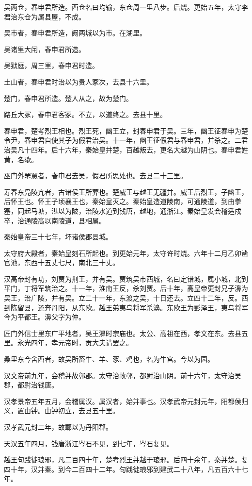 \documentclass[12pt,UTF8]{ctexbook}
\begin{document}
吴两仓，春申君所造。西仓名曰均输，东仓周一里八步。后烧。更始五年，太守李君治东仓为属县屋，不成。

吴市者，春申君所造，阙两城以为市。在湖里。

吴诸里大闬，春申君所造。

吴狱庭，周三里，春申君时造。

土山者，春申君时治以为贵人冢次，去县十六里。

楚门，春申君所造。楚人从之，故为楚门。

路丘大冢，春申君客冢。不立，以道终之。去县十里。

春申君，楚考烈王相也。烈王死，幽王立，封春申君于吴。三年，幽王征春申为楚令尹，春申君自使其子为假君治吴。十一年，幽王征假君与春申君，并杀之。二君治吴凡十四年。后十六年，秦始皇并楚，百越叛去，更名大越为山阴也。春申君姓黄，名歇。

巫门外罘罳者，春申君去吴，假君所思处也。去县二十三里。

寿春东凫陵亢者，古诸侯王所葬也。楚威王与越王无疆并。威王后烈王，子幽王，后怀王也。怀王子顷襄王也，秦始皇灭之。秦始皇造道陵南，可通陵道，到由拳塞，同起马塘，湛以为陂，治陵水道到钱唐，越地，通浙江。秦始皇发会稽适戍卒，治通陵高以南陵道，县相属。

秦始皇帝三十七年，坏诸侯郡县城。

太守府大殿者，秦始皇刻石所起也。到更始元年，太守许时烧。六年十二月乙卯凿官池，东西十五丈七尺，南北三十丈。

汉高帝封有功，刘贾为荆王，并有吴。贾筑吴市西城，名曰定错城，属小城，北到平门，丁将军筑治之。十一年，淮南王反，杀刘贾。后十年，高皇帝更封兄子濞为吴王，治广陵，并有吴。立二十一年，东渡之吴，十日还去。立四十二年，反。西到陈留县，还奔丹阳，从东欧。越王弟夷乌将军杀濞。东欧王为彭泽王，夷乌将军今为平都王。濞父字为仲。

匠门外信士里东广平地者，吴王濞时宗庙也。太公、高祖在西，孝文在东。去县五里。永光四年，孝元帝时，贡大夫请罢之。

桑里东今舍西者，故吴所畜牛、羊、豕、鸡也，名为牛宫。今以为园。

汉文帝前九年，会稽并故鄣郡。太守治故鄣，都尉治山阴。前十六年，太守治吴郡，都尉治钱唐。

汉孝景帝五年五月，会稽属汉。属汉者，始并事也。汉孝武帝元封元年，阳都侯归义，置由钟。由钟初立，去县五十里。

汉孝武元封二年，故鄣以为丹阳郡。

天汉五年四月，钱唐浙江岑石不见，到七年，岑石复见。

越王句践徙琅邪，凡二百四十年，楚考烈王并越于琅邪。后四十余年，秦并楚。复四十年，汉并秦。到今二百四十二年。句践徙琅邪到建武二十八年，凡五百六十七年。
\end{document}
